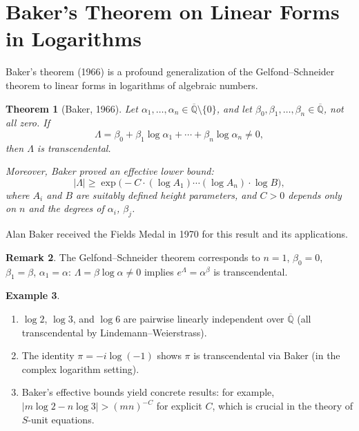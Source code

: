 \documentclass[12pt,a4paper]{amsart}
\newtheorem{theorem}{Theorem}[section]
\theoremstyle{definition}
\newtheorem{example}[theorem]{Example}
\newtheorem{remark}[theorem]{Remark}
\begin{document}
\section{Baker's Theorem on Linear Forms in Logarithms}
\label{sec:baker}

Baker's theorem (1966) is a profound generalization of the Gelfond--Schneider
theorem to linear forms in logarithms of algebraic numbers.

\begin{theorem}[Baker, 1966]
\label{thm:baker}
Let $\alpha_1, \ldots, \alpha_n \in \overline{\mathbb{Q}} \setminus \{0\}$,
and let $\beta_0, \beta_1, \ldots, \beta_n \in \overline{\mathbb{Q}}$, not all
zero. If
\[
  \Lambda = \beta_0 + \beta_1 \log \alpha_1 + \cdots + \beta_n \log \alpha_n \neq 0,
\]
then $\Lambda$ is transcendental.

Moreover, Baker proved an \emph{effective lower bound}:
\[
  |\Lambda| \geq \exp\!\bigl(-C \cdot (\log A_1) \cdots (\log A_n) \cdot \log B\bigr),
\]
where $A_i$ and $B$ are suitably defined height parameters, and $C > 0$ depends
only on $n$ and the degrees of $\alpha_i$, $\beta_j$.
\end{theorem}

Alan Baker received the Fields Medal in 1970 for this result and its applications.

\begin{remark}
The Gelfond--Schneider theorem corresponds to $n = 1$, $\beta_0 = 0$,
$\beta_1 = \beta$, $\alpha_1 = \alpha$: $\Lambda = \beta \log \alpha \neq 0$
implies $e^\Lambda = \alpha^\beta$ is transcendental.
\end{remark}

\begin{example}
\begin{enumerate}[label=(\roman*)]
  \item $\log 2$, $\log 3$, and $\log 6$ are pairwise linearly independent over
        $\overline{\mathbb{Q}}$ (all transcendental by Lindemann--Weierstrass).
  \item The identity $\pi = -i \log(-1)$ shows $\pi$ is transcendental via Baker
        (in the complex logarithm setting).
  \item Baker's effective bounds yield concrete results: for example,
        $|m \log 2 - n \log 3| > (mn)^{-C}$ for explicit $C$, which is
        crucial in the theory of $S$-unit equations.
\end{enumerate}
\end{example}
\end{document}

